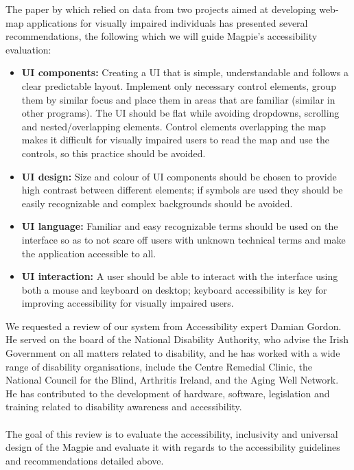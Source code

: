 \noindent The paper by \cite{accessibilitywebmapsrecommendations2017} which relied on data from two projects aimed at developing web-map applications for visually impaired individuals has presented several recommendations, the following which we will guide Magpie's accessibility evaluation:
\begin{itemize}
    \item \textbf{UI components:} Creating a UI that is simple, understandable and follows a clear predictable layout. Implement only necessary control elements, group them by similar focus and place them in areas that are familiar (similar in other programs). The UI should be flat while avoiding dropdowns, scrolling and nested/overlapping elements. Control elements overlapping the map makes it difficult for visually impaired users to read the map and use the controls, so this practice should be avoided.
    \item \textbf{UI design:} Size and colour of UI components should be chosen to provide high contrast between different elements; if symbols are used they should be easily recognizable and complex backgrounds should be avoided.
    \item \textbf{UI language:} Familiar and easy recognizable terms should be used on the interface so as to not scare off users with unknown technical terms and make the application accessible to all.
    \item \textbf{UI interaction:} A user should be able to interact with the interface using both a mouse and keyboard on desktop; keyboard accessibility is key for improving accessibility for visually impaired users.
\end{itemize}

\noindent We requested a review of our system from Accessibility expert Damian Gordon. He served on the board of the National Disability Authority, who advise the Irish Government on all matters related to disability, and he has worked with a wide range of disability organisations, include the Centre Remedial Clinic, the National Council for the Blind, Arthritis Ireland, and the Aging Well Network. He has contributed to the development of hardware, software, legislation and training related to disability awareness and accessibility. \\\\

\noindent The goal of this review is to evaluate the accessibility, inclusivity and universal design of the Magpie and evaluate it with regards to the accessibility guidelines and recommendations detailed above.\\

